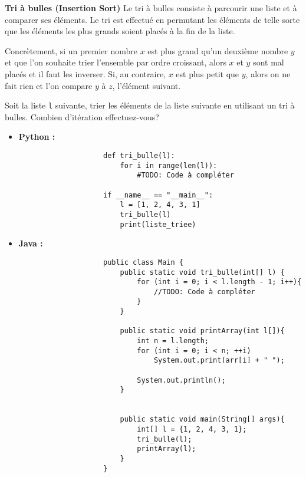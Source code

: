 \begin{Exercice} [10 minutes] \textbf{Tri à bulles (Insertion Sort)}
Le tri à bulles consiste à parcourir une liste et à comparer ses éléments. Le tri est effectué en permutant les éléments de telle sorte que les éléments les plus grands soient placés à la fin de la liste. 

Concrètement, si un premier nombre $x$ est plus grand qu'un deuxième nombre $y$ et que l'on souhaite trier l'ensemble par ordre croissant, alors $x$ et $y$ sont mal placés et il faut les inverser. Si, au contraire, $x$ est plus petit que $y$, alors on ne fait rien et l'on compare $y$ à $z$, l'élément suivant.

Soit la liste \lstinline{l} suivante, trier les éléments de la liste suivante en utilisant un tri à bulles. Combien d'itération effectuez-vous?

\begin{itemize}
        \item \textbf{Python :}
                \begin{verbatim}
                    def tri_bulle(l):
                        for i in range(len(l)):
                            #TODO: Code à compléter
                    
                    if __name__ == "__main__":
                        l = [1, 2, 4, 3, 1]
                        tri_bulle(l)
                        print(liste_triee)
                \end{verbatim}
        \item \textbf{Java :}
                \begin{verbatim}
                    public class Main {
                        public static void tri_bulle(int[] l) {
                            for (int i = 0; i < l.length - 1; i++){
                                //TODO: Code à compléter 
                            }
                        }
                        
                        public static void printArray(int l[]){ 
                            int n = l.length; 
                            for (int i = 0; i < n; ++i) 
                                System.out.print(arr[i] + " "); 
                      
                            System.out.println(); 
                        } 
              
                        
                        public static void main(String[] args){
                            int[] l = {1, 2, 4, 3, 1};
                            tri_bulle(l);
                            printArray(l);
                        }
                    }
                \end{verbatim}
    \end{itemize}
    

\end{Exercice}
